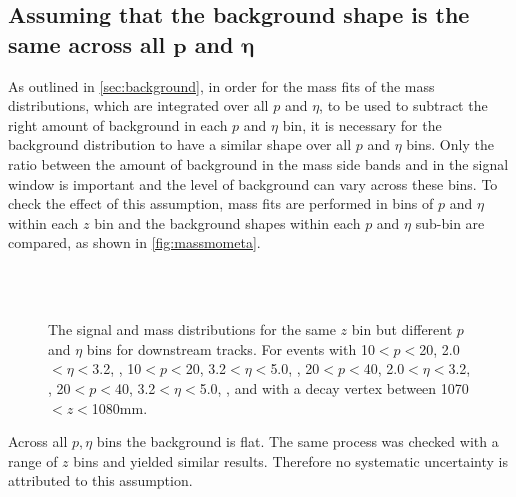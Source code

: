 \subsection[Assuming that the background shape is the same across all $p$ and $\eta$]{Assuming that the background shape is the same across all $\mathbold{p}$ and $\mathbold{\eta}$}
As outlined in \autoref{sec:background}, in order for the mass fits of the \KS mass distributions, which are integrated over all $p$ and $\eta$, to be used to subtract the right amount of background in each $p$ and $\eta$ bin, it is necessary for the background distribution to have a similar shape over all $p$ and $\eta$ bins. Only the ratio between the amount of background in the mass side bands and in the signal window is important and the level of background can vary across these bins. To check the effect of this assumption, mass fits are performed in bins of $p$ and $\eta$ within each $z$ bin and the background shapes within each $p$ and $\eta$ sub-bin are compared, as shown in \autoref{fig:massmometa}.
\begin{figure}
\begin{center}

 
    \\
    \\
 

\end{center}
\caption{The signal and mass distributions for the same $z$ bin but different $p$ and $\eta$ bins for downstream tracks. For events with 10$<p<$20\gevc, 2.0$<\eta<$3.2, \protect{}, 10$<p<$20\gevc, 3.2$<\eta<$5.0, \protect{}, 20$<p<$40\gevc, 2.0$<\eta<$3.2, \protect{}, 20$<p<$40\gevc, 3.2$<\eta<$5.0, \protect{}, and with a decay vertex between 1070$<z<$1080\:mm.           
  \label{fig:massmometa}}
\end{figure}
Across all $p,\eta$ bins the background is flat. The same process was checked with a range of $z$ bins and yielded similar results. Therefore no systematic uncertainty is attributed to this assumption. 

